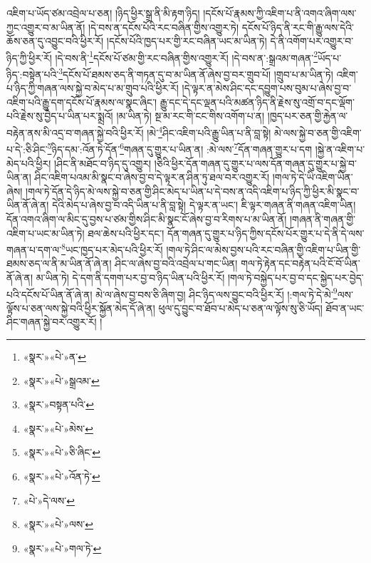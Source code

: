འཇིག་པ་ཡོད་ཙམ་འབྲེལ་པ་ཅན། །ཉིད་ཕྱིར་སྒྲ་ནི་མི་རྟག་ཉིད། །དངོས་པོ་རྣམས་ཀྱི་འཇིག་པ་ནི་འགའ་ཞིག་ལས་ཀྱང་འགྱུར་བ་མ་ཡིན་ནོ། །དེ་བས་ན་དངོས་པོའི་རང་བཞིན་གྱིས་འགྱུར་ཏེ། དངོས་པོ་ཉིད་ནི་རང་གི་རྒྱུ་ལས་དེའི་ཆོས་ཅན་དུ་འབྱུང་བའི་ཕྱིར་རོ། །དངོས་པོའི་ཁྱད་པར་གྱི་རང་བཞིན་ཡང་མ་ཡིན་ཏེ། དེ་ནི་འགོག་པར་འགྱུར་བ་ཉིད་ཀྱི་ཕྱིར་རོ། །དེ་བས་ནི་\footnote{«སྣར་»«པེ་»ན་}དངོས་པོ་ཙམ་གྱི་རང་བཞིན་གྱིས་འགྱུར་རོ། །དེ་བས་ན་:སྒྲའམ་གཞན་\footnote{«སྣར་»«པེ་»སྒྲའམ་}ཡོད་པ་ཉིད་:བསྟེན་པའི་\footnote{«སྣར་»བསྟན་པའི་}དངོས་པོ་ཐམས་ཅད་ནི་གཏན་དུ་བ་མ་ཡིན་ནོ་ཞེས་བྱ་བར་གྲུབ་པོ། །གྲུབ་པ་མ་ཡིན་ཏེ། འཇིག་པ་ཉིད་ཀྱི་གཞན་ལས་སྐྱེ་བ་མེད་པ་མ་གྲུབ་པའི་ཕྱིར་རོ། །དེ་ལྟར་ན་མེས་ཤིང་དང་དབྱུག་པས་བུམ་པ་ཞེས་བྱ་བ་འཇིག་པའི་རྒྱུ་དག་དངོས་པོ་རྣམས་ལ་སྣང་ཞིང་། རྒྱུ་དང་དེ་དང་ལྡན་པའི་མཚན་ཉིད་ནི་རྗེས་སུ་འགྲོ་བ་དང་ལྡོག་པའི་རྗེས་སུ་བྱེད་པ་ཡིན་པར་སྨྲའོ། །མ་ཡིན་ཏེ། སྔ་མ་རང་གི་ངང་གིས་འགོག་པ་ན། །ཁྱད་པར་ཅན་གྱི་རྐྱེན་ལ་བརྟེན་ནས་མི་འདྲ་བ་གཞན་སྐྱེ་བའི་ཕྱིར་རོ། །མེ་\footnote{«སྣར་»«པེ་»མེས་}ཤིང་འཇིག་པའི་རྒྱུ་ཡིན་པ་ནི་བླ་སྟེ། མེ་ལས་སྐྱེ་བ་ཅན་གྱི་འཇིག་པ་དེ་:ཅི་ཤིང་\footnote{«སྣར་»«པེ་»ཅི་ཞིང་}ཉིད་དམ་:འོན་ཏེ་དོན་\footnote{«སྣར་»«པེ་»འོན་ཏེ་}གཞན་དུ་གྱུར་པ་ཡིན་ན། :མེ་ལས་\footnote{«པེ་»དེ་ལས་}དོན་གཞན་གྱུར་པ་དག །སྐྱེ་ན་འཇིག་པ་མེད་པའི་ཕྱིར། །ཤིང་ནི་མཐོང་བ་ཉིད་དུ་འགྱུར། །ཅིའི་ཕྱིར་དོན་གཞན་དུ་གྱུར་པ་ལས་དོན་གཞན་དུ་གྱུར་པ་སྐྱེ་བ་ཡིན་ན། ཤིང་འཇིག་པའམ་མི་སྣང་བ་ཞེས་བྱ་བ་དེ་ལྟར་ན་ཤིན་ཏུ་ཐལ་བར་འགྱུར་རོ། །གལ་ཏེ་དེ་ཡི་འཇིག་ཡིན་ཞེས། །གལ་ཏེ་དོན་དེ་ཉིད་མེ་ལས་སྐྱེ་བ་ཅན་གྱི་ཤིང་མེད་པ་ཡིན་པ་དེ་བས་ན་འདི་འཇིག་པ་ཉིད་ཀྱི་ཕྱིར་མི་སྣང་བ་ཡིན་ནོ་ཞེ་ན། དེའི་མེད་པ་ཞེས་བྱ་བ་འདི་ཡིན་པ་ནི་བླ་སྟེ། དེ་ལྟར་ན་ཡང་། ཇི་ལྟར་གཞན་ནི་གཞན་འཇིག་ཡིན། དོན་འགའ་ཞིག་ལ་མིང་དུ་བྱས་པ་ཙམ་གྱིས་ཤིང་མི་སྣང་ངོ་ཞེས་བྱ་བ་རིགས་པ་མ་ཡིན་ནོ། །གཞན་ནི་གཞན་གྱི་འཇིག་པ་ཡང་མ་ཡིན་ཏེ། ཐལ་ཆེས་པའི་ཕྱིར་དང་། དོན་གཞན་དུ་གྱུར་པ་ཉིད་ཀྱིས་དངོས་པོར་གྱུར་པ་དེ་ནི་དེ་ལས་གཞན་པ་དག་ལ་\footnote{«སྣར་»«པེ་»ལས་}ཡང་ཁྱད་པར་མེད་པའི་ཕྱིར་རོ། །གལ་ཏེ་ཤིང་ལ་མེས་བྱས་པའི་རང་བཞིན་གྱི་འཇིག་པ་ཡིན་གྱི་ཐམས་ཅད་ལ་ནི་མ་ཡིན་ནོ་ཞེ་ན། ཤིང་ལ་ཞེས་བྱ་བའི་འབྲེལ་པ་གང་ཡིན། གལ་ཏེ་རྟེན་དང་བརྟེན་པའི་ངོ་བོ་ཡིན་ནོ་ཞེ་ན། མ་ཡིན་ཏེ། དེ་དག་ནི་དགག་པར་བྱ་བ་ཉིད་ཡིན་པའི་ཕྱིར་རོ། །གལ་ཏེ་བསྐྱེད་པར་བྱ་བ་དང་སྐྱེད་པར་བྱེད་པའི་དངོས་པོ་ཡིན་ནོ་ཞེ་ན། མེ་ལ་ཞེས་བྱ་བས་ཅི་ཞིག་བྱ། ཤིང་ཉིད་ལས་བྱུང་བའི་ཕྱིར་རོ། །:གལ་ཏེ་དེ་མེ་\footnote{«སྣར་»«པེ་»གལ་ཏེ་}ལས་ལྟོས་པ་ཅན་ལས་སྐྱེ་བའི་ཕྱིར་སྐྱོན་མེད་དོ་ཞེ་ན། ཕུལ་དུ་བྱུང་བ་ཐོབ་པ་མེད་པ་ཅན་ལ་ལྟོས་སུ་ཅི་ཡོད། ཐོབ་ན་ཡང་ཤིང་གཞན་སྐྱེ་བར་འགྱུར་རོ། །
